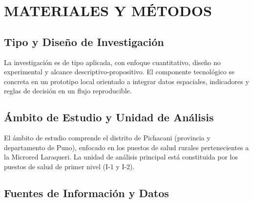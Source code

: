 \documentclass[12pt,a4paper,oneside]{article}
\begin{document}
\section{MATERIALES Y MÉTODOS}

\subsection{Tipo y Diseño de Investigación}
La investigación es de tipo aplicada, con enfoque cuantitativo, diseño no experimental y alcance descriptivo-propositivo. El componente tecnológico se concreta en un prototipo local orientado a integrar datos espaciales, indicadores y reglas de decisión en un flujo reproducible.

\subsection{Ámbito de Estudio y Unidad de Análisis}
El ámbito de estudio comprende el distrito de Pichacani (provincia y departamento de Puno), enfocado en los puestos de salud rurales pertenecientes a la Microred Laraqueri. La unidad de análisis principal está constituida por los puestos de salud de primer nivel (I-1 y I-2).

\subsection{Fuentes de Información y Datos}
\begin{table}[h!]
\centering
\caption{Fuentes principales de información territorial y sanitaria.}
\label{tab:fuentes_datos}
\end{table}
\end{document}
